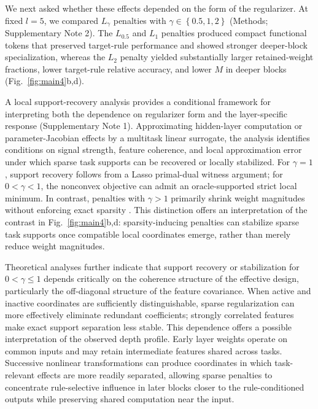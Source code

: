 \documentclass{article}
\begin{document}
We next asked whether these effects depended on the form of the regularizer. At fixed $l=5$, we compared ${L}_{\gamma }$ penalties with $\gamma \in \left\{0.5,1,2\right\}$ (Methods; Supplementary Note 2). The ${L}_{0.5}$ and ${L}_{1}$ penalties produced compact functional tokens that preserved target-rule performance and showed stronger deeper-block specialization, whereas the ${L}_{2}$ penalty yielded substantially larger retained-weight fractions, lower target-rule relative accuracy, and lower $M$ in deeper blocks (Fig.~\ref{fig:main4}b,d).

A local support-recovery analysis provides a conditional framework for interpreting both the dependence on regularizer form and the layer-specific response (Supplementary Note 1). Approximating hidden-layer computation or parameter-Jacobian effects by a multitask linear surrogate, the analysis identifies conditions on signal strength, feature coherence, and local approximation error under which sparse task supports can be recovered or locally stabilized. For $\gamma =1$, support recovery follows from a Lasso primal-dual witness argument; for $0<\gamma <1$, the nonconvex objective can admit an oracle-supported strict local minimum. In contrast, penalties with $\gamma >1$ primarily shrink weight magnitudes without enforcing exact sparsity \cite{zhaoModelSelectionConsistency,maTransformed1Regularization2019}. This distinction offers an interpretation of the contrast in Fig.~\ref{fig:main4}b,d: sparsity-inducing penalties can stabilize sparse task supports once compatible local coordinates emerge, rather than merely reduce weight magnitudes.

Theoretical analyses further indicate that support recovery or stabilization for \(0 < \gamma \leq 1\) depends critically on the coherence structure of the effective design, particularly the off-diagonal structure of the feature covariance. When active and inactive coordinates are sufficiently distinguishable, sparse regularization can more effectively eliminate redundant coefficients; strongly correlated features make exact support separation less stable. This dependence offers a possible interpretation of the observed depth profile. Early layer weights operate on common inputs and may retain intermediate features shared across tasks. Successive nonlinear transformations can produce coordinates in which task-relevant effects are more readily separated, allowing sparse penalties to concentrate rule-selective influence in later blocks closer to the rule-conditioned outputs while preserving shared computation near the input.
\end{document}
